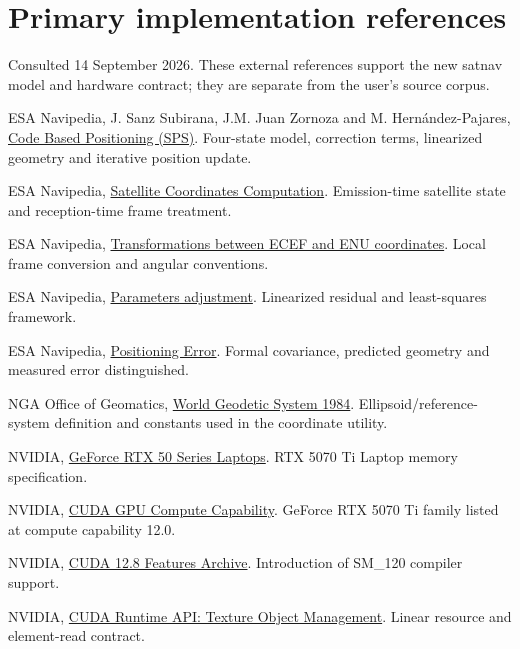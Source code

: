\documentclass[11pt,a4paper]{article}
\begin{document}
\section*{Primary implementation references}
Consulted 14 September 2026. These external references support the new satnav model and
hardware contract; they are separate from the user's source corpus.
\small
\begin{description}[style=nextline,leftmargin=8mm]
\item[G1] ESA Navipedia, J. Sanz Subirana, J.M. Juan Zornoza and M. Hern\'andez-Pajares,
\href{https://gssc.esa.int/navipedia/index.php?title=Code_Based_Positioning_(SPS)}{Code Based Positioning (SPS)}.
Four-state model, correction terms, linearized geometry and iterative position update.
\item[G2] ESA Navipedia, \href{https://gssc.esa.int/navipedia/index.php/Satellite_Coordinates_Computation}{Satellite Coordinates Computation}.
Emission-time satellite state and reception-time frame treatment.
\item[G3] ESA Navipedia, \href{https://gssc.esa.int/navipedia/index.php/Transformations_between_ECEF_and_ENU_coordinates}{Transformations between ECEF and ENU coordinates}.
Local frame conversion and angular conventions.
\item[G4] ESA Navipedia, \href{https://gssc.esa.int/navipedia/index.php?title=Parameters_adjustment}{Parameters adjustment}.
Linearized residual and least-squares framework.
\item[G5] ESA Navipedia, \href{https://gssc.esa.int/navipedia/index.php/Positioning_Error}{Positioning Error}.
Formal covariance, predicted geometry and measured error distinguished.
\item[G6] NGA Office of Geomatics, \href{https://earth-info.nga.mil/index.php?action=wgs84\&dir=wgs84}{World Geodetic System 1984}.
Ellipsoid/reference-system definition and constants used in the coordinate utility.
\item[H1] NVIDIA, \href{https://www.nvidia.com/en-us/geforce/laptops/50-series/}{GeForce RTX 50 Series Laptops}.
RTX 5070 Ti Laptop memory specification.
\item[H2] NVIDIA, \href{https://developer.nvidia.com/cuda/gpus}{CUDA GPU Compute Capability}.
GeForce RTX 5070 Ti family listed at compute capability 12.0.
\item[H3] NVIDIA, \href{https://docs.nvidia.com/cuda/archive/12.8.0/cuda-features-archive/index.html}{CUDA 12.8 Features Archive}.
Introduction of SM\_120 compiler support.
\item[H4] NVIDIA, \href{https://docs.nvidia.com/cuda/cuda-runtime-api/group__CUDART__TEXTURE__OBJECT.html}{CUDA Runtime API: Texture Object Management}.
Linear resource and element-read contract.
\end{description}
\end{document}

